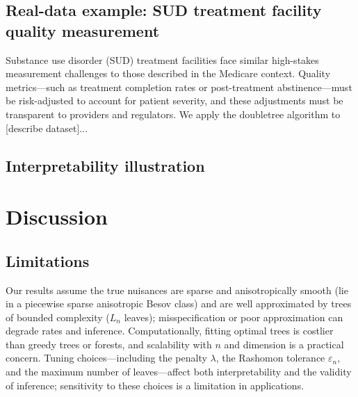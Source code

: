\documentclass[12pt]{article}
\begin{document}
\subsection{Real-data example: SUD treatment facility quality measurement}

Substance use disorder (SUD) treatment facilities face similar high-stakes measurement challenges to those described in the Medicare context. Quality metrics---such as treatment completion rates or post-treatment abstinence---must be risk-adjusted to account for patient severity, and these adjustments must be transparent to providers and regulators. We apply the doubletree algorithm to [describe dataset]...


\subsection{Interpretability illustration}

\section{Discussion}
\label{sec:discussion}

\subsection{Limitations}
Our results assume the true nuisances are sparse and anisotropically smooth (lie in a piecewise sparse anisotropic Besov class) and are well approximated by trees of bounded complexity ($L_n$ leaves); misspecification or poor approximation can degrade rates and inference. Computationally, fitting optimal trees is costlier than greedy trees or forests, and scalability with $n$ and dimension is a practical concern. Tuning choices---including the penalty $\lambda$, the Rashomon tolerance $\varepsilon_n$, and the maximum number of leaves---affect both interpretability and the validity of inference; sensitivity to these choices is a limitation in applications.
\end{document}
